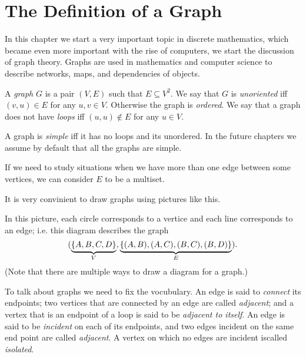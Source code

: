 \chapter{The Definition of a Graph}
In this chapter we start a very important topic in discrete mathematics, which
became even more important with the rise of computers, we start the discussion
of graph theory. Graphs are used in mathematics and computer science to describe
networks, maps, and dependencies of objects.

\begin{definition}
  A \emph{graph} $G$ is a pair $(V, E)$ such that $E \subseteq V^2$.
  We say that $G$ is \emph{unoriented} iff $(v, u) \in E$ for
  any $u, v \in V$. Otherwise the graph is \emph{ordered}.
  We say that a graph does not have \emph{loops} iff $(u, u) \notin E$ for any
  $u \in V$.
\end{definition}
A graph is \emph{simple} iff it has no loops and its unordered. In the future
chapters we assume by default that all the graphs are simple.

\begin{remark}
  If we need to study situations when we have more than one edge between some
  vertices, we can consider $E$ to be a multiset.
\end{remark}

It is very convinient to draw graphs using pictures like this.
\begin{center}
\end{center}
In this picture, each circle corresponds to a vertice and each line corresponds
to an edge; i.e. this diagram describes the graph
\[
  (\underbrace{\set{A, B, C, D}}_V,
  \underbrace{\set{(A, B), (A, C), (B, C), (B, D)}}_E).
\]
(Note that there are multiple ways to draw a diagram for a graph.)

To talk about graphs we need to fix the vocubulary.
An edge is said to \emph{connect} its endpoints; two vertices that are
connected by an edge are called \emph{adjacent}; and a vertex that is an
endpoint of a loop is said to be \emph{adjacent to itself}. An edge is said to
be \emph{incident} on each of its endpoints, and two edges incident
on the same end point are called \emph{adjacent}. A vertex on which no edges
are incident iscalled \emph{isolated}.

